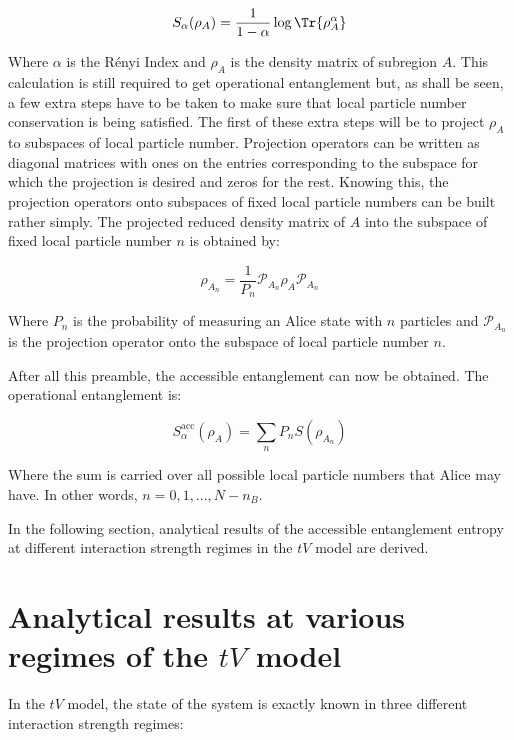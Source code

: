 	
\begin{equation}
 S_{\alpha}(\rho_{A}) = \frac{1}{1-\alpha} \log{\Tr{\rho_{A}^{\alpha}}} 
\end{equation}

Where $\alpha$ is the R\'enyi Index and $\rho_{A}$ is the density matrix of subregion $A$. This calculation is still required to get operational entanglement but, as shall be seen, a few extra steps have to be taken to make sure that local particle number conservation is being satisfied. The first of these extra steps will be to project $\rho_{A}$ to subspaces of local particle number. Projection operators can be written as diagonal matrices with ones on the entries corresponding to the subspace for which the projection is desired and zeros for the rest. Knowing this, the projection operators onto subspaces of fixed local particle numbers can be built rather simply. The projected reduced density matrix of  $A$ into the subspace of fixed local particle number $n$ is obtained by:

\begin{equation}
\rho_{A_n} = \frac{1}{P_n} \mathcal{P}_{A_n} \rho_A \mathcal{P}_{A_n}
\label{eq:accessibleEE}
\end{equation}

Where $P_n$ is the probability of measuring an Alice state with $n$ particles and $\mathcal{P}_{A_n}$ is the projection operator onto the subspace of local particle number $n$.

After all this preamble, the accessible entanglement can now be obtained. The operational entanglement is:

\begin{equation}
S_{\alpha}^{\mathrm{acc}}(\rho_A) = \sum_{n} P_n S(\rho_{A_n}) 
\label{eq:accessibleEE}
\end{equation}

Where the sum is carried over all possible local particle numbers that Alice may have. In other words, $n=0,1,...,N-n_{B}$.

In the following section, analytical results of the accessible entanglement entropy at different interaction strength regimes in the $tV$ model are derived.

\section{Analytical results at various regimes of the $tV$ model}
	In the $tV$ model, the state of the system is exactly known in three different interaction strength regimes:
	
